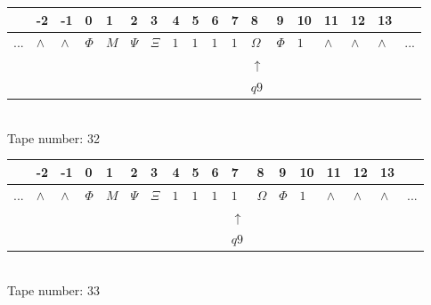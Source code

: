 \documentclass[11pt]{article}
\begin{document}
\begin{table}[H]
\centering
\begin{tabular}{llllllllllllllllll}
 & -2 & -1 & 0 & 1 & 2 & 3 & 4 & 5 & 6 & 7 & 8 & 9 & 10 & 11 & 12 & 13 & \\
\hline
$...$ & \multicolumn{1}{|l|}{$\wedge$} & \multicolumn{1}{|l|}{$\wedge$} & \multicolumn{1}{|l|}{$\Phi$} & \multicolumn{1}{|l|}{$M$} & \multicolumn{1}{|l|}{$\Psi$} & \multicolumn{1}{|l|}{$\Xi$} & \multicolumn{1}{|l|}{$1$} & \multicolumn{1}{|l|}{$1$} & \multicolumn{1}{|l|}{$1$} & \multicolumn{1}{|l|}{$1$} & \multicolumn{1}{|l|}{$\Omega$} & \multicolumn{1}{|l|}{$\Phi$} & \multicolumn{1}{|l|}{$1$} & \multicolumn{1}{|l|}{$\wedge$} & \multicolumn{1}{|l|}{$\wedge$} & \multicolumn{1}{|l|}{$\wedge$} & $...$\\
\hline
&  &  &  &  &  &  &  &  &  &  & $\uparrow$ &  &  &  &  &  &  \\
&  &  &  &  &  &  &  &  &  &  & $ q9 $ &  &  &  &  &  &  \\
\end{tabular}
\\
Tape number: 32
\noindent\makebox[\linewidth]{\hdashrule{\textwidth}{1pt}{1pt}}\end{table}

\begin{table}[H]
\centering
\begin{tabular}{llllllllllllllllll}
 & -2 & -1 & 0 & 1 & 2 & 3 & 4 & 5 & 6 & 7 & 8 & 9 & 10 & 11 & 12 & 13 & \\
\hline
$...$ & \multicolumn{1}{|l|}{$\wedge$} & \multicolumn{1}{|l|}{$\wedge$} & \multicolumn{1}{|l|}{$\Phi$} & \multicolumn{1}{|l|}{$M$} & \multicolumn{1}{|l|}{$\Psi$} & \multicolumn{1}{|l|}{$\Xi$} & \multicolumn{1}{|l|}{$1$} & \multicolumn{1}{|l|}{$1$} & \multicolumn{1}{|l|}{$1$} & \multicolumn{1}{|l|}{$1$} & \multicolumn{1}{|l|}{$\Omega$} & \multicolumn{1}{|l|}{$\Phi$} & \multicolumn{1}{|l|}{$1$} & \multicolumn{1}{|l|}{$\wedge$} & \multicolumn{1}{|l|}{$\wedge$} & \multicolumn{1}{|l|}{$\wedge$} & $...$\\
\hline
&  &  &  &  &  &  &  &  &  & $\uparrow$ &  &  &  &  &  &  &  \\
&  &  &  &  &  &  &  &  &  & $ q9 $ &  &  &  &  &  &  &  \\
\end{tabular}
\\
Tape number: 33
\noindent\makebox[\linewidth]{\hdashrule{\textwidth}{1pt}{1pt}}\end{table}
\end{document}
